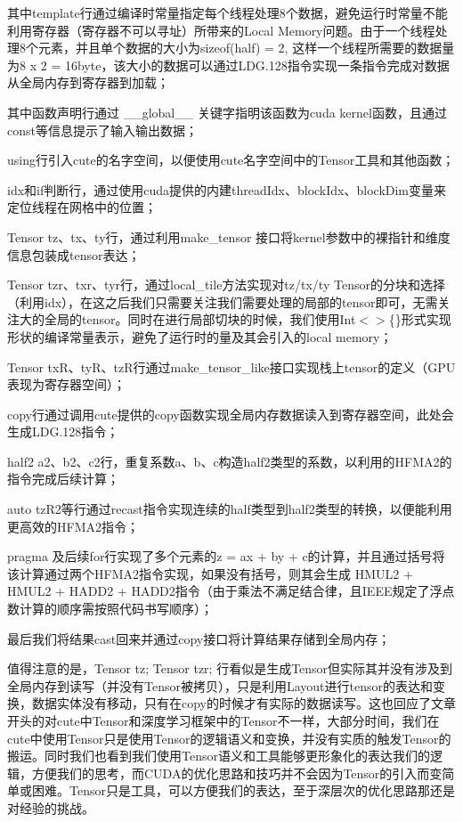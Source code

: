 其中template行通过编译时常量指定每个线程处理8个数据，避免运行时常量不能利用寄存器（寄存器不可以寻址）所带来的Local Memory问题。由于一个线程处理8个元素，并且单个数据的大小为sizeof(half) = 2, 这样一个线程所需要的数据量为8 x 2 = 16byte，该大小的数据可以通过LDG.128指令实现一条指令完成对数据从全局内存到寄存器到加载；

其中函数声明行通过 \_\_global\_\_ 关键字指明该函数为cuda kernel函数，且通过const等信息提示了输入输出数据；

using行引入cute的名字空间，以便使用cute名字空间中的Tensor工具和其他函数；

idx和if判断行，通过使用cuda提供的内建threadIdx、blockIdx、blockDim变量来定位线程在网格中的位置；

Tensor tz、tx、ty行，通过利用make\_tensor 接口将kernel参数中的裸指针和维度信息包装成tensor表达；

Tensor tzr、txr、tyr行，通过local\_tile方法实现对tz/tx/ty Tensor的分块和选择（利用idx），在这之后我们只需要关注我们需要处理的局部的tensor即可，无需关注大的全局的tensor。同时在进行局部切块的时候，我们使用Int$<$$>$\{\}形式实现形状的编译常量表示，避免了运行时的量及其会引入的local memory；

Tensor txR、tyR、tzR行通过make\_tensor\_like接口实现栈上tensor的定义（GPU表现为寄存器空间）；

copy行通过调用cute提供的copy函数实现全局内存数据读入到寄存器空间，此处会生成LDG.128指令；

half2 a2、b2、c2行，重复系数a、b、c构造half2类型的系数，以利用的HFMA2的指令完成后续计算；

auto tzR2等行通过recast指令实现连续的half类型到half2类型的转换，以便能利用更高效的HFMA2指令；

pragma 及后续for行实现了多个元素的z = ax + by + c的计算，并且通过括号将该计算通过两个HFMA2指令实现，如果没有括号，则其会生成 HMUL2 + HMUL2 + HADD2 + HADD2指令（由于乘法不满足结合律，且IEEE规定了浮点数计算的顺序需按照代码书写顺序）；

最后我们将结果cast回来并通过copy接口将计算结果存储到全局内存；

值得注意的是，Tensor tz; Tensor tzr; 行看似是生成Tensor但实际其并没有涉及到全局内存到读写（并没有Tensor被拷贝），只是利用Layout进行tensor的表达和变换，数据实体没有移动，只有在copy的时候才有实际的数据读写。这也回应了文章开头的对cute中Tensor和深度学习框架中的Tensor不一样，大部分时间，我们在cute中使用Tensor只是使用Tensor的逻辑语义和变换，并没有实质的触发Tensor的搬运。同时我们也看到我们使用Tensor语义和工具能够更形象化的表达我们的逻辑，方便我们的思考，而CUDA的优化思路和技巧并不会因为Tensor的引入而变简单或困难。Tensor只是工具，可以方便我们的表达，至于深层次的优化思路那还是对经验的挑战。

